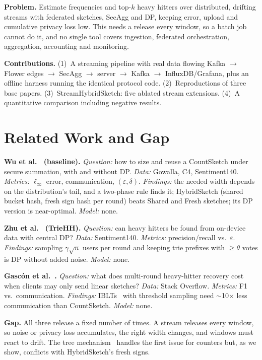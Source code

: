 \documentclass[conference]{IEEEtran}
\newcommand{\eps}{\varepsilon}
\begin{document}
\textbf{Problem.} Estimate frequencies and top-$k$ heavy hitters over distributed, drifting streams with federated
sketches, SecAgg and DP, keeping error, upload and cumulative privacy loss low. This needs a release every window, so a
batch job cannot do it, and no single tool covers ingestion, federated orchestration, aggregation, accounting and monitoring.

\textbf{Contributions.} (1)~A streaming pipeline with real data flowing Kafka $\rightarrow$ Flower edges $\rightarrow$
SecAgg $\rightarrow$ server $\rightarrow$ Kafka $\rightarrow$ InfluxDB/Grafana, plus an offline harness running the
identical protocol code. (2)~Reproductions of three base papers. (3)~StreamHybridSketch: five ablated stream extensions.
(4)~A quantitative comparison including negative results.

\section{Related Work and Gap}
\textbf{Wu et al.~\cite{wu2023} (baseline).} \emph{Question:} how to size and reuse a CountSketch under secure
summation, with and without DP. \emph{Data:} Gowalla, C4, Sentiment140. \emph{Metrics:} $\ell_\infty$ error,
communication, $(\eps,\delta)$. \emph{Findings:} the needed width depends on the distribution's tail, and a two-phase
rule finds it; HybridSketch (shared bucket hash, fresh sign hash per round) beats Shared and Fresh sketches; its DP
version is near-optimal. \emph{Model:} none.

\textbf{Zhu et al.~\cite{zhu2020} (TrieHH).} \emph{Question:} can heavy hitters be found from on-device data with
central DP? \emph{Data:} Sentiment140. \emph{Metrics:} precision/recall vs.\ $\eps$. \emph{Findings:} sampling
$\gamma\sqrt n$ users per round and keeping trie prefixes with $\ge\theta$ votes is DP without added noise.
\emph{Model:} none.

\textbf{Gasc\'on et al.~\cite{gascon2023}.} \emph{Question:} what does multi-round heavy-hitter recovery cost when
clients may only send linear sketches? \emph{Data:} Stack Overflow. \emph{Metrics:} F1 vs.\ communication.
\emph{Findings:} IBLTs~\cite{goodrich2011} with threshold sampling need $\sim$10$\times$ less communication than
CountSketch. \emph{Model:} none.

\textbf{Gap.} All three release a fixed number of times. A stream releases every window, so noise or privacy loss
accumulates, the right width changes, and windows must react to drift. The tree mechanism~\cite{dwork2010,chan2011}
handles the first issue for counters but, as we show, conflicts with HybridSketch's fresh signs.
\end{document}
